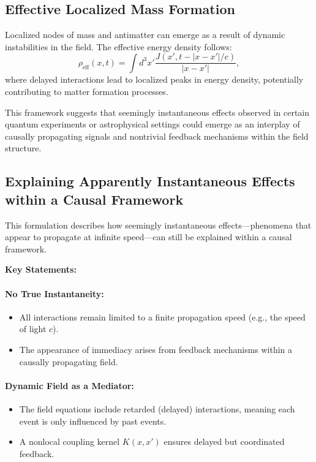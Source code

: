 \documentclass[a4paper,11pt]{article}
\begin{document}
\subsection{Effective Localized Mass Formation}
Localized nodes of mass and antimatter can emerge as a result of dynamic instabilities in the field. The effective energy density follows:
\begin{equation}
	\rho_{\text{eff}}(x,t) = \int d^3x' \frac{J(x',t- |x-x'|/c)}{|x-x'|},
\end{equation}
where delayed interactions lead to localized peaks in energy density, potentially contributing to matter formation processes.

This framework suggests that seemingly instantaneous effects observed in certain quantum experiments or astrophysical settings could emerge as an interplay of causally propagating signals and nontrivial feedback mechanisms within the field structure.

\subsection{Explaining Apparently Instantaneous Effects within a Causal Framework}

This formulation describes how seemingly instantaneous effects—phenomena that appear to propagate at infinite speed—can still be explained within a causal framework.

\textbf{Key Statements:}

\paragraph{No True Instantaneity:}
\begin{itemize}
	\item All interactions remain limited to a finite propagation speed (e.g., the speed of light $c$).
	\item The appearance of immediacy arises from feedback mechanisms within a causally propagating field.
\end{itemize}

\paragraph{Dynamic Field as a Mediator:}
\begin{itemize}
	\item The field equations include retarded (delayed) interactions, meaning each event is only influenced by past events.
	\item A nonlocal coupling kernel $K(x,x')$ ensures delayed but coordinated feedback.
\end{itemize}
\end{document}

